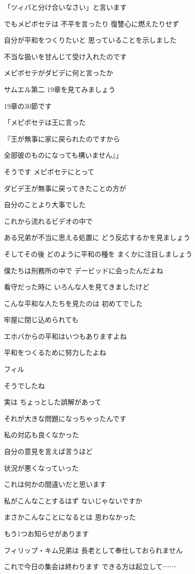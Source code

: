 \documentclass[twocolumn]{jsarticle}
\begin{document}
「ツィバと分け合いなさい」と言います

でもメピボセテは 不平を言ったり
復讐心に燃えたりせず

自分が平和をつくりたいと
思っていることを示しました

不当な扱いを甘んじて受け入れたのです

メピボセテがダビデに何と言ったか

サムエル第二 19章を見てみましょう

19章の30節です

「メピボセテは王に言った

『王が無事に家に戻られたのですから

全部彼のものになっても構いません』」

そうです メピボセテにとって

ダビデ王が無事に戻ってきたことの方が

自分のことより大事でした

これから流れるビデオの中で

ある兄弟が不当に思える処置に
どう反応するかを見ましょう

そしてその後 どのように平和の種を
まくかに注目しましょう

僕たちは刑務所の中で
デービッドに会ったんだよね

看守だった時に
いろんな人を見てきましたけど

こんな平和な人たちを見たのは
初めてでした

牢屋に閉じ込められても

エホバからの平和はいつもありますよね

平和をつくるために努力したよね

フィル

そうでしたね

実は ちょっとした誤解があって

それが大きな問題になっちゃったんです

私の対応も良くなかった

自分の意見を言えば言うほど

状況が悪くなっていった

これは何かの間違いだと思います

私がこんなことするはず
ないじゃないですか

まさかこんなことになるとは
思わなかった

もう1つお知らせがあります

フィリップ・キム兄弟は
長老として奉仕しておられません

これで今日の集会は終わります
できる方は起立して⋯⋯
\end{document}

